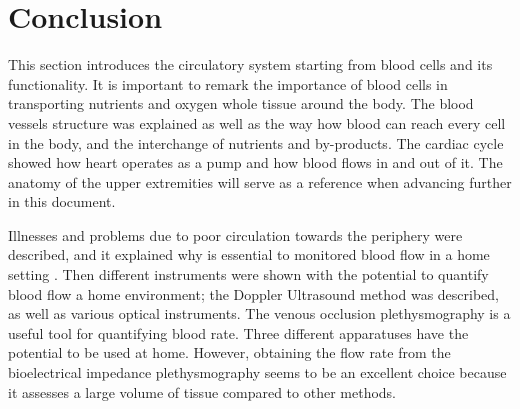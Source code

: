 \section{Conclusion}
This section introduces the circulatory system starting from blood cells and its functionality. It is important to remark the importance of blood cells in transporting nutrients and oxygen whole tissue around the body. The blood vessels structure was explained as well as the way how blood can reach every cell in the body, and the interchange of nutrients and by-products. The cardiac cycle showed how heart operates as a pump and how blood flows in and out of it. The anatomy of the upper extremities will serve as a reference when advancing further in this document.  

Illnesses and problems due to poor circulation towards the periphery were described, and it explained why is essential to monitored blood flow in a home setting . Then different instruments were shown with the potential to quantify blood flow a home environment; the Doppler Ultrasound method was described, as well as various optical instruments. The venous occlusion plethysmography is a useful tool for quantifying blood rate. Three different apparatuses have the potential to be used at home. However, obtaining the flow rate from the bioelectrical impedance plethysmography seems to be an excellent choice because it assesses a large volume of tissue compared to other methods. 




